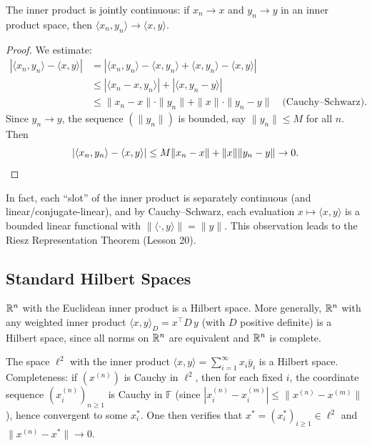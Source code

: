 \documentclass[11pt,a4paper]{article}
\begin{document}
\begin{proposition}
\label{prop:ip_continuity}
The inner product is jointly continuous: if $x_n \to x$ and $y_n \to y$ in
an inner product space, then $\langle x_n, y_n \rangle \to \langle x, y
\rangle$.
\end{proposition}

\begin{proof}
We estimate:
\begin{align*}
|\langle x_n, y_n \rangle - \langle x, y \rangle|
&= |\langle x_n, y_n \rangle - \langle x, y_n \rangle
   + \langle x, y_n \rangle - \langle x, y \rangle| \\
&\le |\langle x_n - x, y_n \rangle| + |\langle x, y_n - y \rangle| \\
&\le \|x_n - x\| \cdot \|y_n\| + \|x\| \cdot \|y_n - y\|
\quad \text{(Cauchy--Schwarz)}.
\end{align*}
Since $y_n \to y$, the sequence $(\|y_n\|)$ is bounded, say
$\|y_n\| \le M$ for all $n$. Then
\[
|\langle x_n, y_n \rangle - \langle x, y \rangle|
\le M \|x_n - x\| + \|x\| \|y_n - y\| \to 0. \qedhere
\]
\end{proof}

\begin{remark}
\label{rem:ip_separate_cts}
In fact, each ``slot'' of the inner product is separately continuous (and
linear/conjugate-linear), and by Cauchy--Schwarz, each evaluation
$x \mapsto \langle x, y \rangle$ is a bounded linear functional with
$\|\langle \cdot, y \rangle\| = \|y\|$. This observation leads to the Riesz
Representation Theorem (Lesson 20).
\end{remark}

\subsection{Standard Hilbert Spaces}

\begin{example}
\label{ex:Rn_hilbert}
$\mathbb{R}^n$ with the Euclidean inner product is a Hilbert space. More generally,
$\mathbb{R}^n$ with any weighted inner product $\langle x, y \rangle_D = x^\top D\, y$
(with $D$ positive definite) is a Hilbert space, since all norms on $\mathbb{R}^n$
are equivalent and $\mathbb{R}^n$ is complete.
\end{example}

\begin{example}
\label{ex:ell2_hilbert}
The space $\ell^2$ with the inner product $\langle x, y \rangle =
\sum_{i=1}^\infty x_i \bar{y}_i$ is a Hilbert space. Completeness: if
$(x^{(n)})$ is Cauchy in $\ell^2$, then for each fixed $i$, the coordinate
sequence $(x_i^{(n)})_{n \ge 1}$ is Cauchy in $\mathbb{F}$ (since
$|x_i^{(n)} - x_i^{(m)}| \le \|x^{(n)} - x^{(m)}\|$), hence convergent to
some $x_i^*$. One then verifies that $x^* = (x_i^*)_{i \ge 1} \in \ell^2$
and $\|x^{(n)} - x^*\| \to 0$.
\end{example}
\end{document}

